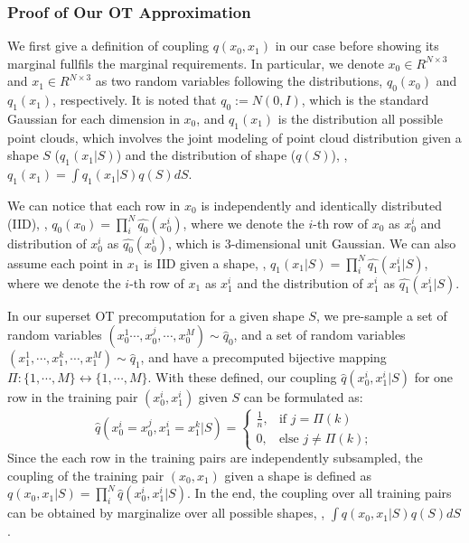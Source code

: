 \newtheorem{theorem}{Theorem}
\subsubsection{Proof of Our OT Approximation}
\label{subsec:our_ot_proof}

We first give a definition of coupling $q(x_0, x_1)$ in our case before showing its marginal fullfils the marginal requirements.
%
In particular, we denote $x_0 \in R^{N \times 3}$ and $x_1 \in R^{N \times 3}$ as two random variables following the distributions, $q_0(x_0)$ and $q_1(x_1)$, respectively.
%
It is noted that $q_0 := N(0, I)$, which is the standard Gaussian for each dimension in $x_0$, and $q_1(x_1)$ is the distribution all possible point clouds, which involves the joint modeling of point cloud distribution given a shape $S$ ($q_{1}(x_1|S)$) and the distribution of shape ($q(S)$), \ie, $q_1(x_1) = \int q_{1}(x_1|S) q(S) dS$.
%

We can notice that each row in $x_0$ is independently and identically distributed (IID), \ie, $q_0(x_0) = \prod_{i}^N \hat{q_0}(x_0^i)$, where we denote the $i$-th row of $x_0$ as $x_0^i$ and distribution of $x_0^i$ as $\hat{q_0}(x_0^i)$, which is 3-dimensional unit Gaussian.
%
We can also assume each point in $x_1$ is IID given a shape, \ie, $q_{1}(x_1 | S) = \prod_{i}^N \hat{q_{1}}(x_1^i|S)$,  where we denote the $i$-th row of $x_1$ as $x^i_1$ and the distribution of $x^i_1$ as $\hat{q_{1}}(x_1^i|S)$. 

In our superset OT precomputation for a given shape $S$, we pre-sample a set of random variables $(x^1_0 \cdots, x^j_0, \cdots, x^M_0) \sim \hat{q}_0$, and a set of random variables  $(x^1_1, \cdots, x^k_1,\cdots, x^M_1) \sim \hat{q}_1$, and have a precomputed bijective mapping $\Pi : \{1, \cdots, M\} \leftrightarrow \{1, \cdots, M\}$.
%
With these defined, our coupling $\hat{q}(x^i_0, x^i_1 |S)$ for one row in the training pair $(x^i_0, x^i_1)$ given $S$ can be formulated as:
\[
    \hat{q}(x^i_0 = x^j_0, x^i_1 = x^k_1 | S) =
    \begin{cases}
    \frac{1}{n}, & \text{if } j = \Pi(k) \\ 
        0, & \text{else } j \neq \Pi(k);
    \end{cases}
\]
%
Since the each row in the training pairs are independently subsampled, the coupling of the training pair $(x_0, x_1)$ given a shape is defined as $q(x_0, x_1 |S) = \prod_{i}^N \hat{q}(x_0^i, x_1^i | S)$.
%
In the end, the coupling over all training pairs can be obtained by marginalize over all possible shapes, \ie, $\int q(x_0, x_1 | S) q(S) dS$.

